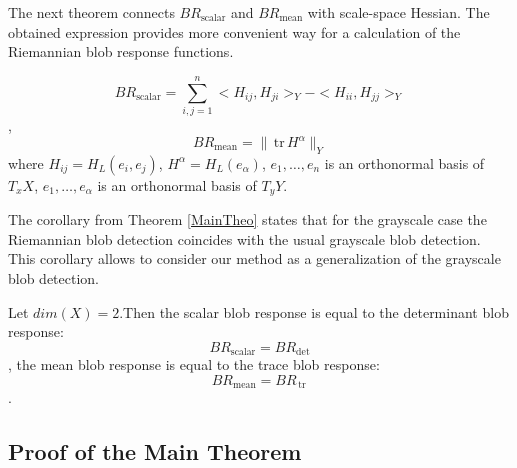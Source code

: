 \documentclass{llncs}
\newcommand{\TangentSpaceArg}[2]{{T_{#2}}{#1}}
\newcommand{\FRScalar}{BR_{\mathrm{scalar}}}
\newcommand{\FRMean}{BR_{\mathrm{mean}}}
\newcommand {\tr}{{\,}\mathrm{tr}{\,}}
\begin{document}
The next theorem connects $\FRScalar$ and $\FRMean$ with scale-space Hessian. The obtained expression provides more convenient way for a calculation of the Riemannian blob response functions.

\begin{theorem} \label{MainTheo}
$$\FRScalar=\sum_{i,j=1}^{n}{<H_{ij},H_{ji}>_Y-<H_{ii},H_{jj}>_Y}$$,
$$\FRMean=\|\tr H^\alpha\|_Y$$
where $H_{ij}=H_L (e_i,e_j)$, $H^\alpha=H_L (e_\alpha)$, 
$e_1,\dots,e_n$ is an orthonormal basis of $\TangentSpaceArg{X}{x}$, $e_1,\dots,e_\alpha$ is an orthonormal basis of $\TangentSpaceArg{Y}{y}$.
\end{theorem}

The corollary from Theorem \ref{MainTheo} states that for the grayscale case the Riemannian blob detection coincides with the usual grayscale blob detection. This corollary allows to consider our method as a generalization of the grayscale blob detection.

\begin{corollary}\label{GrayscaleCol}
Let $dim(X)=2$.Then the scalar blob response is equal to the determinant blob response:
$$\FRScalar=BR_{\det}$$,
the mean blob response is equal to the trace blob response:
$$\FRMean=BR_{\tr}$$.
\end{corollary}

\subsection{Proof of the Main Theorem}
\end{document}
